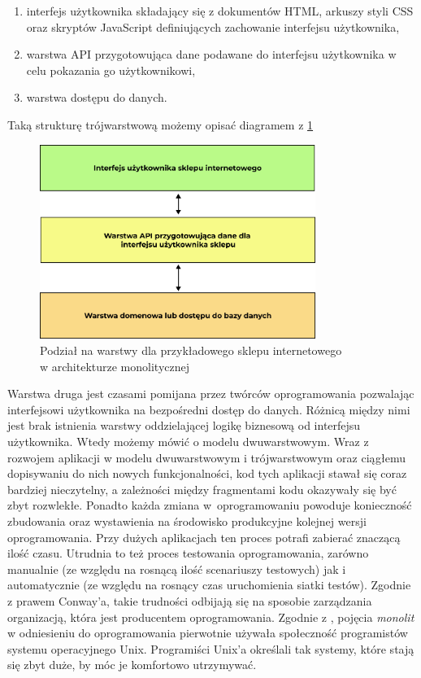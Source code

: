 \documentclass{SGGW-thesis}
\begin{document}
\begin{enumerate}
	\item interfejs użytkownika składający się z dokumentów HTML, arkuszy styli CSS oraz skryptów JavaScript definiujących zachowanie interfejsu użytkownika,
	\item warstwa API przygotowująca dane podawane do interfejsu użytkownika w celu pokazania go użytkownikowi,
	\item warstwa dostępu do danych.
\end{enumerate}

Taką strukturę trójwarstwową możemy opisać diagramem z \cref{fig:monolith_diagram}

\begin{figure}[h]
	\centering
	\captionsetup{justification=centering}
	\includegraphics[width=0.8\textwidth]{monolith_diagram.png}
	\caption{Podział na warstwy dla przykładowego sklepu internetowego \\ w architekturze monolitycznej}
	\label{fig:monolith_diagram}
\end{figure}

Warstwa druga jest czasami pomijana przez twórców oprogramowania pozwalając interfejsowi użytkownika na bezpośredni dostęp do danych. Różnicą między nimi jest brak istnienia warstwy oddzielającej logikę biznesową od interfejsu użytkownika. Wtedy możemy mówić o modelu dwuwarstwowym.
Wraz z rozwojem aplikacji w modelu dwuwarstwowym i trójwarstwowym oraz ciągłemu dopisywaniu do nich nowych funkcjonalności, kod tych aplikacji stawał się coraz bardziej nieczytelny, a zależności między fragmentami kodu okazywały się być zbyt rozwlekłe.
Ponadto każda zmiana w~oprogramowaniu powoduje konieczność zbudowania oraz wystawienia na środowisko produkcyjne kolejnej wersji oprogramowania. Przy dużych aplikacjach ten proces potrafi zabierać znaczącą ilość czasu. Utrudnia to też proces testowania oprogramowania, zarówno manualnie (ze względu na rosnącą ilość scenariuszy testowych) jak i automatycznie (ze względu na rosnący czas uruchomienia siatki testów).
Zgodnie z prawem Conway'a, takie trudności odbijają się na sposobie zarządzania organizacją, która jest producentem oprogramowania.
Zgodnie z \cite{fowler}, pojęcia \textit{monolit} w odniesieniu do oprogramowania pierwotnie używała społeczność programistów systemu operacyjnego Unix. Programiści Unix'a określali tak systemy, które stają się zbyt duże, by móc je komfortowo utrzymywać.
\end{document}
